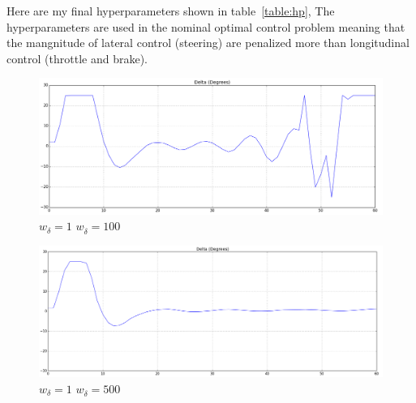 Here are my final hyperparameters shown in table~\ref{table:hp}, The hyperparameters are used in the nominal optimal control problem meaning that the mangnitude of lateral control (steering) are penalized more than longitudinal control (throttle and brake).

\begin{table}[h!]
\centering
{}
\vspace{0.1cm}
\caption{Final hyperparameters.}
\label{table:hp}
\end{table}

\begin{figure}[H]
\centering
    \includegraphics[width=0.8\linewidth]{./delta_1_100.png}
      \vspace{-0.1cm}
\caption{$w_{\delta}=1$ $w_{\dot{\delta}}=100$}
\label{fig:fig1}
\end{figure}

\begin{figure}[H]
\centering
    \includegraphics[width=0.8\linewidth]{./delta_1_500.png}
      \vspace{-0.1cm}
\caption{$w_{\delta}=1$ $w_{\dot{\delta}}=500$}
\label{fig:fig2}
\end{figure}

